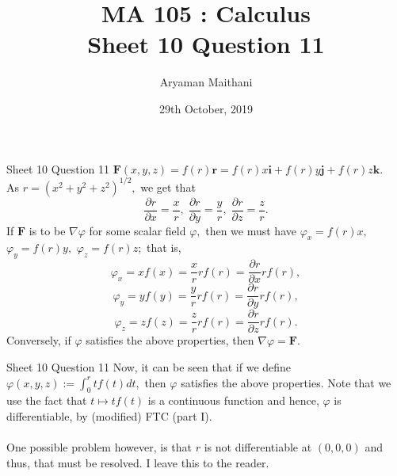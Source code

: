 \documentclass[handout, aspectratio=169]{beamer}
\title{MA 105 : Calculus\\ Sheet 10 Question 11}  %
\author{Aryaman Maithani}
\date[29-10-2019]{29th October, 2019}               %
\institute[IITB]{IIT Bombay}
\begin{document}
\begin{frame}{Sheet 10 Question 11}                            %
	$\mathbf{F}(x, y, z) = f(r)\mathbf{r} = f(r)x \mathbf{i} + f(r)y \mathbf{j} + f(r)z \mathbf{k}.$\\
	As $r = (x^2 + y^2 + z^2)^{1/2},$ we get that
	\[\frac{\partial r}{\partial x} = \frac{x}{r},\;\frac{\partial r}{\partial y} = \frac{y}{r},\;\frac{\partial r}{\partial z} = \frac{z}{r}.\]
	If $\mathbf{F}$ is to be $\nabla\varphi$ for some scalar field $\varphi,$ then we must have $\varphi_x = f(r)x,$ $\varphi_y = f(r)y,$ $\varphi_z = f(r)z;$ that is, 
	\[\varphi_x = xf(x) = \frac{x}{r}rf(r) = \frac{\partial r}{\partial x}rf(r),\] 
	\[\varphi_y = yf(y) = \frac{y}{r}rf(r) = \frac{\partial r}{\partial y}rf(r),\] 
	\[\varphi_z = zf(z) = \frac{z}{r}rf(r) = \frac{\partial r}{\partial z}rf(r).\]
	Conversely, if $\varphi$ satisfies the above properties, then $\nabla \varphi = \mathbf{F}.$\\
\end{frame}
\begin{frame}{Sheet 10 Question 11} 
	Now, it can be seen that if we define $\varphi(x, y, z) := \displaystyle\int_{0}^{r} tf(t) dt,$ then $\varphi$ satisfies the above properties. Note that we use the fact that $t \mapsto tf(t)$ is a continuous function and hence, $\varphi$ is differentiable, by (modified) FTC (part I).\\~\\
	One possible problem however, is that $r$ is not differentiable at $(0, 0, 0)$ and thus, that must be resolved. I leave this to the reader.
\end{frame}
\end{document}
